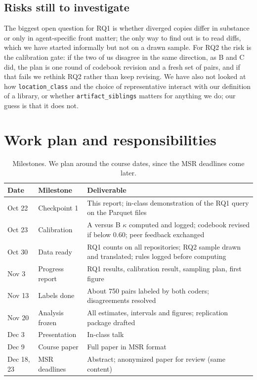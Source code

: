 \documentclass[11pt]{article}
\begin{document}
\subsection{Risks still to investigate}
The biggest open question for RQ1 is whether diverged copies differ in substance or only in agent-specific front matter;
the only way to find out is to read diffs, which we have started informally but not on a drawn sample. For RQ2 the risk is
the calibration gate: if the two of us disagree in the same direction, as B and C did, the plan is one round of codebook
revision and a fresh set of pairs, and if that fails we rethink RQ2 rather than keep revising. We have also not looked
at how \texttt{location\_class} and the choice of representative interact with our definition of a library, or whether
\texttt{artifact\_siblings} matters for anything we do; our guess is that it does not.

\section{Work plan and responsibilities}

\begin{table}[h]
\centering\small
\begin{tabularx}{\textwidth}{llY}
\toprule
Date & Milestone & Deliverable \\
\midrule
Oct 22 & Checkpoint 1 & This report; in-class demonstration of the RQ1 query on the Parquet files \\
Oct 23 & Calibration & A versus B $\kappa$ computed and logged; codebook revised if below 0.60; peer feedback exchanged \\
Oct 30 & Data ready & RQ1 counts on all repositories; RQ2 sample drawn and translated; rules logged before computing \\
Nov 3 & Progress report & RQ1 results, calibration result, sampling plan, first figure \\
Nov 13 & Labels done & About 750 pairs labeled by both coders; disagreements resolved \\
Nov 20 & Analysis frozen & All estimates, intervals and figures; replication package drafted \\
Dec 3 & Presentation & In-class talk \\
Dec 9 & Course paper & Full paper in MSR format \\
Dec 18, 23 & MSR deadlines & Abstract; anonymized paper for review (same content) \\
\bottomrule
\end{tabularx}
\caption{Milestones. We plan around the course dates, since the MSR deadlines come later.}
\end{table}
\end{document}
